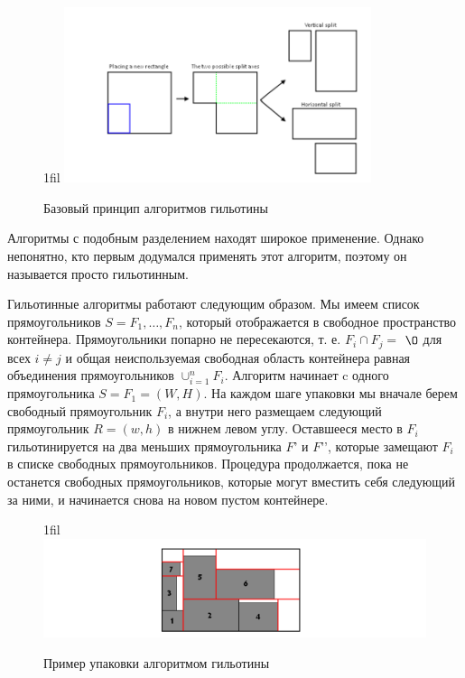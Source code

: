 \documentclass[a4paper,12pt]{report}
\makeatletter
\theoremstyle{remark}
\newcommand*{\centerfloat}{%
  \parindent \z@
  \leftskip \z@ \@plus 1fil \@minus \textwidth
  \rightskip\leftskip
  \parfillskip \z@skip}
\makeatother
\begin{document}
\begin{figure}
    \centerfloat
    \includegraphics[width=0.8\textwidth]{packing/2.png}
    \caption{Базовый принцип алгоритмов гильотины}
    \label{fig:guil}
\end{figure}

Алгоритмы с подобным разделением находят широкое применение. Однако непонятно, кто первым додумался применять этот алгоритм, поэтому он называется просто гильотинным.

Гильотинные алгоритмы работают следующим образом. Мы имеем список прямоугольников $S = {F_1, … , F_n}$, который отображается в свободное пространство контейнера. Прямоугольники попарно не пересекаются, т. е. $F_i \cap F_j =$ $\O$ для всех $i \neq j$ и общая неиспользуемая свободная область контейнера равная объединения прямоугольников $\cup^{n}_{i=1}F_i$. Алгоритм начинает c одного прямоугольника $S = {F_1 = (W, H)}$. На каждом шаге упаковки мы вначале берем свободный прямоугольник $F_i$, а внутри него размещаем следующий прямоугольник $R = (w, h)$ в нижнем левом углу. Оставшееся место в $F_i$ гильотинируется на два меньших прямоугольника $F’$ и $F’{’}$, которые замещают $F_i$ в списке свободных прямоугольников. Процедура продолжается, пока не останется свободных прямоугольников, которые могут вместить  себя следующий за ними, и начинается снова на новом пустом контейнере.

\begin{figure}
    \centerfloat
    \includegraphics[width=1.5\textwidth]{packing/3.png}
    \caption{Пример упаковки алгоритмом гильотины}
    \label{fig:guil2}
\end{figure}
\end{document}
